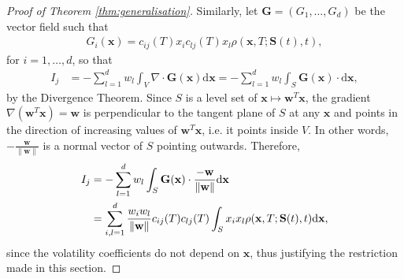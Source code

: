 \documentclass[english]{article}
\numberwithin{equation}{section}
\numberwithin{figure}{section}
\theoremstyle{bolddescit}
\theoremstyle{definition}
\theoremstyle{definition}
\theoremstyle{plain}
\theoremstyle{plain}
\theoremstyle{bolddesc}
\theoremstyle{plain}
\theoremstyle{remark}
\begin{document}
\begin{proof}[Proof of Theorem \ref{thm:generalisation}]
  Similarly, let $\mathbf{G} = (G_1,\ldots,G_d)$ be the vector field such that
  \begin{align*}
    G_i(\mathbf{x}) = c_{ij}(T) x_i c_{lj}(T) x_l \rho(\mathbf{x},T;\mathbf{S}(t),t),
  \end{align*}
  for $i=1,\ldots,d$, so that
  \begin{align*}
    I_j
    &= - \sum_{l=1}^{d} w_l \int_V \nabla \cdot \mathbf{G}(\mathbf{x}) \mathrm{d}\mathbf{x}
    = - \sum_{l=1}^{d} w_l \int_S \mathbf{G}(\mathbf{x}) \cdot \mathrm{d}\mathbf{x},
  \end{align*}
  by the Divergence Theorem. Since $S$ is a level set of $\mathbf{x} \mapsto \mathbf{w}^T \mathbf{x}$, the gradient $\nabla (\mathbf{w}^T \mathbf{x}) = \mathbf{w}$ is perpendicular to the tangent plane of $S$ at any $\mathbf{x}$ and points in the direction of increasing values of $\mathbf{w}^T \mathbf{x}$, i.e. it points inside $V$. In other words, $- \frac{\mathbf{w}}{\|\mathbf{w}\|}$ is a normal vector of $S$ pointing outwards. Therefore,
  \begin{align}
    I_j
    &= - \sum_{l=1}^{d} w_l \int_S \mathbf{G}(\mathbf{x}) \cdot \frac{-\mathbf{w}}{\|\mathbf{w}\|} \mathrm{d}\mathbf{x}\notag\\
    &= \sum_{i,l=1}^{d} \frac{w_i w_l}{\|\mathbf{w}\|} c_{ij}(T) c_{lj}(T) \int_S x_i x_l \rho(\mathbf{x},T;\mathbf{S}(t),t) \mathrm{d}\mathbf{x},\label{eq:generalisation-Ij}
  \end{align}
  since the volatility coefficients do not depend on $\mathbf{x}$, thus justifying the restriction made in this section.


\end{proof}
\end{document}
